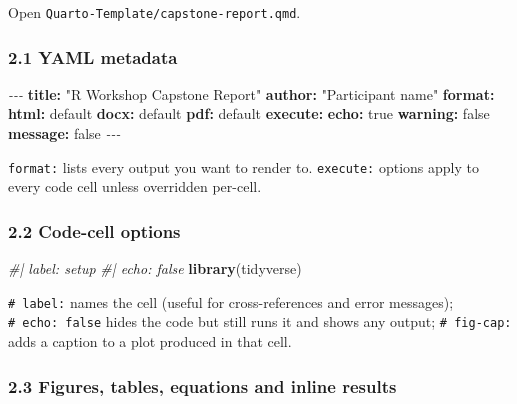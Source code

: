 \documentclass[11pt]{article}
\newenvironment{Shaded}{\begin{snugshade}}{\end{snugshade}}
\newcommand{\AttributeTok}[1]{\textcolor[rgb]{0.13,0.29,0.53}{#1}}
\newcommand{\CharTok}[1]{\textcolor[rgb]{0.31,0.60,0.02}{#1}}
\newcommand{\CommentTok}[1]{\textcolor[rgb]{0.56,0.35,0.01}{\textit{#1}}}
\newcommand{\FunctionTok}[1]{\textcolor[rgb]{0.13,0.29,0.53}{\textbf{#1}}}
\newcommand{\KeywordTok}[1]{\textcolor[rgb]{0.13,0.29,0.53}{\textbf{#1}}}
\newcommand{\NormalTok}[1]{#1}
\newcommand{\PreprocessorTok}[1]{\textcolor[rgb]{0.56,0.35,0.01}{\textit{#1}}}
\newcommand{\StringTok}[1]{\textcolor[rgb]{0.31,0.60,0.02}{#1}}
\begin{document}
Open \texttt{Quarto-Template/capstone-report.qmd}.

\hypertarget{yaml-metadata}{%
\subsubsection{2.1 YAML metadata}\label{yaml-metadata}}

\begin{Shaded}
\begin{Highlighting}[]
\PreprocessorTok{{-}{-}{-}}
\FunctionTok{title}\KeywordTok{:}\AttributeTok{ }\StringTok{"R Workshop Capstone Report"}
\FunctionTok{author}\KeywordTok{:}\AttributeTok{ }\StringTok{"Participant name"}
\FunctionTok{format}\KeywordTok{:}
\AttributeTok{  }\FunctionTok{html}\KeywordTok{:}\AttributeTok{ default}
\AttributeTok{  }\FunctionTok{docx}\KeywordTok{:}\AttributeTok{ default}
\AttributeTok{  }\FunctionTok{pdf}\KeywordTok{:}\AttributeTok{ default}
\FunctionTok{execute}\KeywordTok{:}
\AttributeTok{  }\FunctionTok{echo}\KeywordTok{:}\AttributeTok{ }\CharTok{true}
\AttributeTok{  }\FunctionTok{warning}\KeywordTok{:}\AttributeTok{ }\CharTok{false}
\AttributeTok{  }\FunctionTok{message}\KeywordTok{:}\AttributeTok{ }\CharTok{false}
\PreprocessorTok{{-}{-}{-}}
\end{Highlighting}
\end{Shaded}

\texttt{format:} lists every output you want to render to.
\texttt{execute:} options apply to every code cell unless overridden
per-cell.

\hypertarget{code-cell-options}{%
\subsubsection{2.2 Code-cell options}\label{code-cell-options}}

\begin{Shaded}
\begin{Highlighting}[]
\CommentTok{\#| label: setup}
\CommentTok{\#| echo: false}
\FunctionTok{library}\NormalTok{(tidyverse)}
\end{Highlighting}
\end{Shaded}

\texttt{\#\textbar{}\ label:} names the cell (useful for
cross-references and error messages);
\texttt{\#\textbar{}\ echo:\ false} hides the code but still runs it and
shows any output; \texttt{\#\textbar{}\ fig-cap:} adds a caption to a
plot produced in that cell.

\hypertarget{figures-tables-equations-and-inline-results}{%
\subsubsection{2.3 Figures, tables, equations and inline
results}\label{figures-tables-equations-and-inline-results}}
\end{document}
